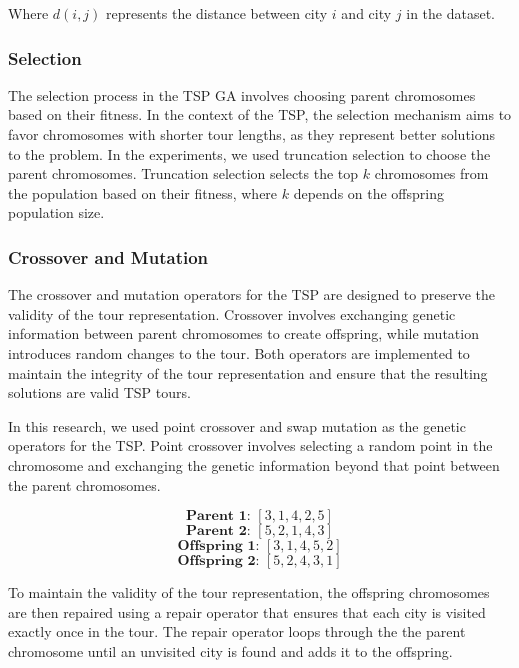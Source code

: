 \documentclass[conference]{IEEEtran}
\begin{document}
Where $d(i, j)$ represents the distance between city $i$ and city $j$ in the
dataset.

\subsubsection{Selection}
The selection process in the TSP GA involves choosing parent chromosomes based
on their fitness. In the context of the TSP, the selection mechanism aims to
favor chromosomes with shorter tour lengths, as they represent better solutions
to the problem. In the experiments, we used truncation selection to choose the
parent chromosomes. Truncation selection selects the top $k$ chromosomes from
the population based on their fitness, where $k$ depends on the offspring
population size. 

\subsubsection{Crossover and Mutation}
The crossover and mutation operators for the TSP are designed to preserve the
validity of the tour representation. Crossover involves exchanging genetic
information between parent chromosomes to create offspring, while mutation
introduces random changes to the tour. Both operators are implemented to
maintain the integrity of the tour representation and ensure that the resulting
solutions are valid TSP tours.

In this research, we used point crossover and swap mutation as the genetic
operators for the TSP. Point crossover involves selecting a random point in the
chromosome and exchanging the genetic information beyond that point between the
parent chromosomes.

\begin{equation*}
    \textbf{Parent 1: } [3, 1, 4, 2, 5]
\end{equation*}
\begin{equation*}
    \textbf{Parent 2: } [5, 2, 1, 4, 3]
\end{equation*}
\begin{equation*}
    \textbf{Offspring 1: } [3, 1, 4, 5, 2]
\end{equation*}
\begin{equation*}
    \textbf{Offspring 2: } [5, 2, 4, 3, 1]
\end{equation*}

To maintain the validity of the tour representation, the offspring chromosomes
are then repaired using a repair operator that ensures that each city is
visited exactly once in the tour. The repair operator loops through the the
parent chromosome until an unvisited city is found and adds it to the
offspring.
\end{document}
